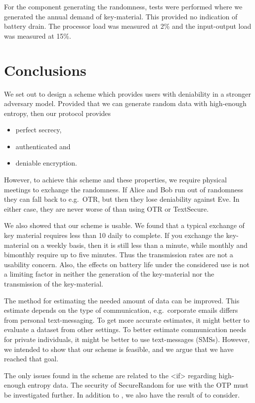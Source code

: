 For the component generating the randomness, tests were performed where we 
generated the annual demand of key-material.
This provided no indication of battery drain.
The processor load was measured at \unit{2}{\%} and the input-output load was 
  measured at \unit{15}{\%}. 


\section{Conclusions}
\label{sec:Conclusions}
We set out to design a scheme which provides users with deniability in 
a stronger adversary model.
Provided that we can generate random data with high-enough entropy, then our 
protocol provides
\begin{itemize}
  \item perfect secrecy,
  \item authenticated and
  \item deniable encryption.
\end{itemize}
However, to achieve this scheme and these properties, we require physical 
meetings to exchange the randomness.
If Alice and Bob run out of randomness they can fall back to e.g.~\ac{OTR}, but 
then they lose deniability against Eve.
In either case, they are never worse of than using \ac{OTR} or TextSecure.

We also showed that our scheme is usable.
We found that a typical exchange of key material requires less than 
\unit{10}{\second} daily to complete.
If you exchange the key-material on a weekly basis, then it is still less than 
a minute, while monthly and bimonthly require up to five minutes.
Thus the transmission rates are not a usability concern.
Also, the effects on battery life under the considered use is not a limiting 
factor in neither the generation of the key-material nor the transmission of 
the key-material.

The method for estimating the needed amount of data can be improved.
This estimate depends on the type of communication, e.g.~corporate emails 
differs from personal text-messaging.
To get more accurate estimates, it might better to evaluate a dataset from 
other settings.
To better estimate communication needs for private individuals, it might be 
better to use text-messages (SMSs).
However, we intended to show that our scheme is feasible, and we argue that we 
have reached that goal.

The only issues found in the scheme are related to the <if> regarding 
high-enough entropy data.
The security of SecureRandom for use with the \ac{OTP} must be investigated 
further.
In addition to \cite{JavaRandomness,AndroidLowEntropyMyth}, we also have the 
result of \citet{UniversalityOTP} to consider.

